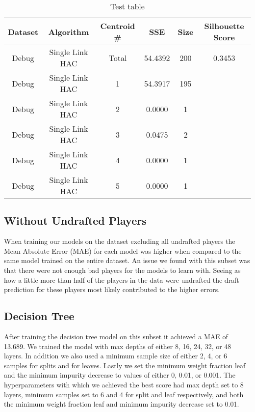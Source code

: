 \documentclass{article}
\begin{document}
\begin{table*}
	\begin{center}
		\begin{tabular}{||c c c c c c||} 
		\hline\hline
		Dataset & Algorithm & Centroid \# & SSE & Size & Silhouette Score \\ 
		\hline\hline
		Debug & Single Link HAC & Total & 54.4392 & 200 & 0.3453 \\ \hline
		Debug & Single Link HAC & 1 & 54.3917 & 195 & \\ \hline
		Debug & Single Link HAC & 2 & 0.0000 & 1 & \\ \hline
		Debug & Single Link HAC & 3 & 0.0475 & 2 & \\ \hline
		Debug & Single Link HAC & 4 & 0.0000 & 1 & \\ \hline
		Debug & Single Link HAC & 5 & 0.0000 & 1 & \\ \hline
		\hline\hline
		\end{tabular}
	\end{center}
	\caption{Test table}
	\label{tab:test_table}
\end{table*}

\subsection{Without Undrafted Players}

When training our models on the dataset excluding all undrafted players the Mean Absolute Error (MAE) 
for each model was higher when compared to the same model trained on the entire dataset. 
An issue we found with this subset was that there were not enough bad players for the models to learn with.
Seeing as how a little more than half of the players in the data were undrafted the draft prediction 
for these players most likely contributed to the higher errors.

\subsection{Decision Tree}

After training the decision tree model on this subset it achieved a MAE of 13.689. 
We trained the model with max depths of either 8, 16, 24, 32, or 48 layers. In addition we also used 
a minimum sample size of either 2, 4, or 6 samples for splits and for leaves. Lastly we set the minimum 
weight fraction leaf and the minimum impurity decrease to values of either 0, 0.01, or 0.001.
The hyperparameters with which we achieved the best score had max depth set to 8 layers, 
minimum samples set to 6 and 4 for split and leaf respectively, and both the minimum weight 
fraction leaf and minimum impurity decrease set to 0.01.
\end{document}
